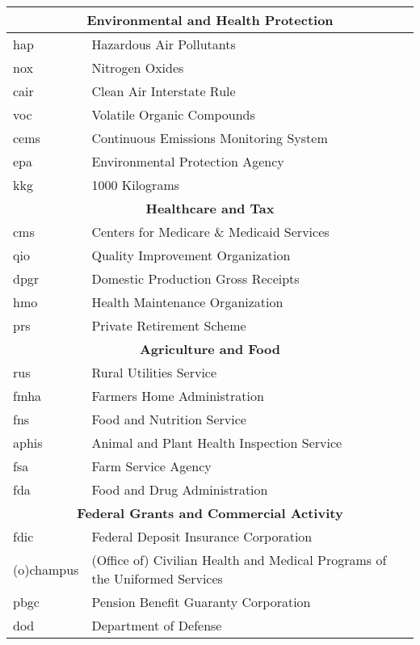 \footnotesize
\begin{tabular}{ll}
    \toprule
    \multicolumn{2}{c}{\bfseries Environmental and Health Protection}\\
    \midrule
    hap             &Hazardous Air Pollutants\\
    nox             &Nitrogen Oxides\\
    cair            &Clean Air Interstate Rule\\
    voc             &Volatile Organic Compounds\\
    cems            &Continuous Emissions Monitoring System\\
    epa             &Environmental Protection Agency\\
    kkg             &1000 Kilograms\\   
    \midrule
    \multicolumn{2}{c}{\bfseries Healthcare and Tax}\\
    \midrule
    cms             &Centers for Medicare \& Medicaid Services\\
    qio             &Quality Improvement Organization\\
    dpgr            &Domestic Production Gross Receipts\\
    hmo             &Health Maintenance Organization\\
    prs             &Private Retirement Scheme\\
    \midrule
    \multicolumn{2}{c}{\bfseries Agriculture and Food}\\
    \midrule
    rus             &Rural Utilities Service\\
    fmha            &Farmers Home Administration\\
    fns             &Food and Nutrition Service\\
    aphis           &Animal and Plant Health Inspection Service\\
    fsa             &Farm Service Agency\\
    fda             &Food and Drug Administration\\
    \midrule
    \multicolumn{2}{c}{\bfseries Federal Grants and Commercial Activity}\\
    \midrule
    fdic            &Federal Deposit Insurance Corporation\\
    (o)champus      &(Office of) Civilian Health and Medical Programs of the Uniformed Services\\
    pbgc            &Pension Benefit Guaranty Corporation\\
    dod             &Department of Defense\\

\end{tabular}
